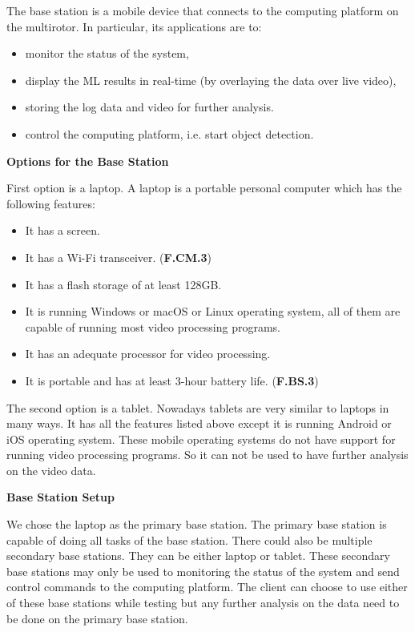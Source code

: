 The base station is a mobile device that connects to the computing platform on the multirotor. In particular, its applications are to:
\begin{itemize}
    \item monitor the status of the system,
    \item display the ML results in real-time (by overlaying the data over live video),
    \item storing the log data and video for further analysis.
    \item control the computing platform, i.e. start object detection.
\end{itemize}

\textbf{Options for the Base Station}

First option is a laptop. A laptop is a portable personal computer which has the following features:
\begin{itemize}
    \item It has a screen.
    \item It has a Wi-Fi transceiver. (\textbf{F.CM.3})
    \item It has a flash storage of at least 128GB.
    \item It is running Windows or macOS or Linux operating system, all of them are capable of running most video processing programs.
    \item It has an adequate processor for video processing.
    \item It is portable and has at least 3-hour battery life. (\textbf{F.BS.3})
\end{itemize}

The second option is a tablet. Nowadays tablets are very similar to laptops in many ways. It has all the features listed above except it is running Android or iOS operating system. These mobile operating systems do not have support for running video processing programs. So it can not be used to have further analysis on the video data.

\textbf{Base Station Setup}

We chose the laptop as the primary base station. The primary base station is capable of doing all tasks of the base station. There could also be multiple secondary base stations. They can be either laptop or tablet. These secondary base stations may only be used to monitoring the status of the system and send control commands to the computing platform. The client can choose to use either of these base stations while testing but any further analysis on the data need to be done on the primary base station.

